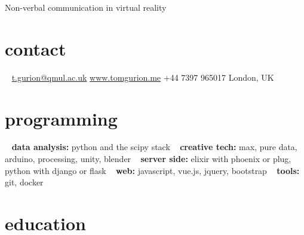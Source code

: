 \documentclass[]{friggeri-cv}
\begin{document}
       {Non-verbal communication in virtual reality}



\begin{aside}
\section{contact}
~
\href{mailto:t.gurion@qmul.ac.uk}{t.gurion@qmul.ac.uk}
\href{http://www.tomgurion.me}{www.tomgurion.me}
+44 7397 965017
London, UK
~
\section{programming}
~
\textbf{data analysis:} python and the scipy stack
~
\textbf{creative tech:} max, pure data, arduino, processing, unity, blender
~
\textbf{server side:} elixir with phoenix or plug, python with django or flask
~
\textbf{web:} javascript, vue.js, jquery, bootstrap
~
\textbf{tools:} git, docker
\end{aside}



\section{education}
\end{document}
